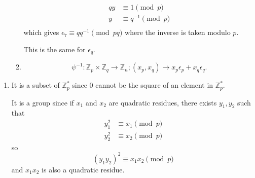 \begin{solution}
\begin{enumerate}
\begin{enumerate}
          \begin{align*}
            qy & \equiv 1 \pmod{p}\\
             y & \equiv q^{-1} \pmod{p}\\
          \end{align*}
          which gives $\epsilon_7 \equiv qq^{-1} \pmod{pq}$
          where the inverse is taken modulo $p$.

          This is the same for $\epsilon_q$.
        \item
          \[ \psi^{-1} : \mathbb{Z}_p \times \mathbb{Z}_q \to \mathbb{Z}_n; (x_p, x_q) \to x_p\epsilon_p + x_q\epsilon_q. \]
      \end{enumerate}
  \end{enumerate}
\end{solution}

\begin{solution}
  \begin{enumerate}
    \item
      It is a subset of $\mathbb{Z}_p^*$ since $0$
      cannot be the square of an element in $\mathbb{Z}_p^*$.

      It is a group since if $x_1$ and $x_2$ are quadratic residues,
      there exists $y_1,y_2$ such that
      \begin{align*}
        y_1^2 & \equiv x_1 \pmod{p}\\
        y_2^2 & \equiv x_2 \pmod{p}
      \end{align*}
      so
      \[ (y_1y_2)^2 \equiv x_1x_2 \pmod{p} \]
      and $x_1x_2$ is also a quadratic residue.
  \end{enumerate}
\end{solution}

\nosolution
\nosolution
\nosolution
